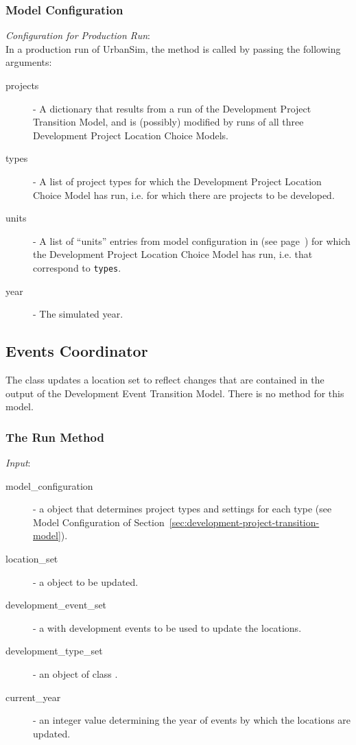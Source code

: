 \subsubsection{Model Configuration}
\modelsindex
%
{\em Configuration for Production Run}:\\[1mm]
In a production run of UrbanSim, the  method is called by
passing the following arguments:
\begin{description}
\item[projects] - A dictionary that results from a run of the Development
  Project Transition Model, \modelsindex and is (possibly) modified by runs of all three
  Development Project Location Choice Models. \modelsindex
\item[types] - A list of project types for which the Development Project
  Location Choice Model \modelsindex has run, i.e. for which there are projects to be
  developed.
\item[units] - A list of ``units'' entries from model \modelsindex configuration in
   (see page~\pageref{page:model-configuration}) for which the
  Development Project Location Choice Model \modelsindex has run, i.e. that correspond to
  \verb|types|.
\item[year] - The simulated year.
\end{description}


%
\subsection{Events Coordinator}
\label{sec:events-coordinator}
%
The class  updates a location set to reflect changes
that are contained in the output of the Development Event Transition Model. \modelsindex
There is no  method for this model. \modelsindex
%
\subsubsection{The Run Method}
%
{\it Input}:
\begin{description}
\item[model_configuration] \modelsindex - a  object that determines
  project types and settings for each type (see Model \modelsindex Configuration of
  Section~\ref{sec:development-project-transition-model}).
\item[location_set] - a  \datasetindex object to be updated.
\item[development_event_set] - a  with development
  events to be used to update the locations.
\item[development_type_set] - an object of class .
\item[current_year] - an integer value determining the year of events by
  which the locations are updated.
\end{description}

